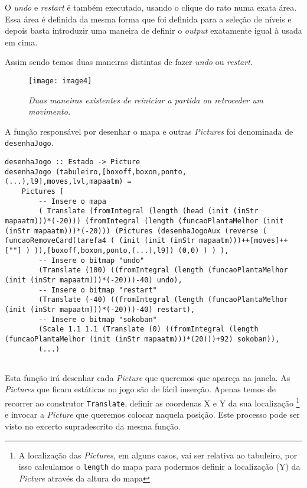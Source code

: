 \documentclass[a4paper,12pt]{report}
\begin{document}
O {\sl undo} e {\sl restart} é também executado, usando o clique do rato numa exata área. Essa área é definida da mesma forma que foi definida para a seleção de níveis e depois basta introduzir uma maneira de definir o {\sl output} exatamente igual à usada em cima. 

Assim sendo temos duas maneiras distintas de fazer {\sl undo} ou {\sl restart}.

\begin{figure}[h]
	\centering
	\texttt{[image: image4]}
	\caption{\small\sl Duas maneiras existentes de reiniciar a partida ou retroceder um movimento.}
	\captionsetup[figure]{list=yes}
\end{figure}

A função responsável por desenhar o mapa e outras {\sl Pictures} foi denominada de {\footnotesize\tt desenhaJogo}.

\begin{lstlisting}[caption={\small\sl Excerto da função {\footnotesize\tt desenhaJogo} que é responsável por desenhar as Pictures presentes na janela.}]
desenhaJogo :: Estado -> Picture
desenhaJogo (tabuleiro,[boxoff,boxon,ponto,(...),l9],moves,lvl,mapaatm) = 
	Pictures [ 
		-- Insere o mapa
		( Translate (fromIntegral (length (head (init (inStr mapaatm)))*(-20))) (fromIntegral (length (funcaoPlantaMelhor (init (inStr mapaatm)))*(-20))) (Pictures (desenhaJogoAux (reverse ( funcaoRemoveCard(tarefa4 ( (init (init (inStr mapaatm)))++[moves]++[""] ) )),[boxoff,boxon,ponto,(...),l9]) (0,0) ) ) ),
		-- Insere o bitmap "undo"
		(Translate (100) ((fromIntegral (length (funcaoPlantaMelhor (init (inStr mapaatm)))*(-20)))-40) undo),
		-- Insere o bitmap "restart"
		(Translate (-40) ((fromIntegral (length (funcaoPlantaMelhor (init (inStr mapaatm)))*(-20)))-40) restart),
		-- Insere o bitmap "sokoban"
		(Scale 1.1 1.1 (Translate (0) ((fromIntegral (length (funcaoPlantaMelhor (init (inStr mapaatm)))*(20)))+92) sokoban)),
		(...)
  
\end{lstlisting}

Esta função irá desenhar cada {\sl Picture} que queremos que apareça na janela. As {\sl Pictures} que ficam estáticas no jogo são de fácil inserção. Apenas temos de recorrer ao construtor {\footnotesize\tt Translate}, definir as coordenas X e Y da sua localização \footnote{\scriptsize A localização das {\sl Pictures}, em alguns casos, vai ser relativa ao tabuleiro, por isso calculamos o {\scriptsize\tt length} do mapa para podermos definir a localização (Y) da {\sl Picture} através da altura do mapa} e invocar a {\sl Picture} que queremos colocar naquela posição. Este processo pode ser visto no excerto supradescrito da mesma função.
\end{document}
